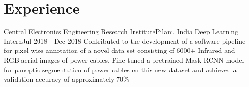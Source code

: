 \section{Experience}
\resumeSubHeadingListStart

\resumeHeadingFour
{Central Electronics Engineering Research Institute}{Pilani, India}
{Deep Learning Intern}{Jul 2018 - Dec 2018}
\resumeItemListStart
{}
{Contributed to the development of a software pipeline for pixel wise annotation of a novel data set consisting of 6000+ Infrared and RGB aerial images of power cables.}
{Fine-tuned a pretrained Mask RCNN model for panoptic segmentation of power cables on this new dataset and achieved a validation accuracy of approximately 70\%}
\resumeItemListEnd

\resumeSubHeadingListEnd
